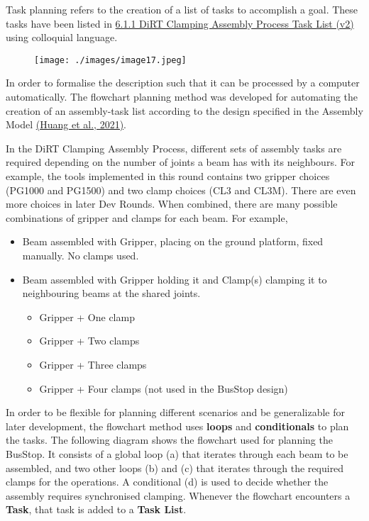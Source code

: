 Task planning refers to the creation of a list of tasks to accomplish a goal. These tasks have been listed in \uline{6.1.1 DiRT Clamping Assembly Process Task List (v2)} using colloquial language.

\begin{figure}[H]
\texttt{[image: ./images/image17.jpeg]}
\end{figure}


In order to formalise the description such that it can be processed by a computer automatically. The flowchart planning method was developed for automating the creation of an assembly-task list according to the design specified in the Assembly Model \href{https://www.zotero.org/google-docs/?cKlfeU}{(Huang et al., 2021)}.

In the DiRT Clamping Assembly Process, different sets of assembly tasks are required depending on the number of joints a beam has with its neighbours. For example, the tools implemented in this round contains two gripper choices (PG1000 and PG1500) and two clamp choices (CL3 and CL3M). There are even more choices in later Dev Rounds. When combined, there are many possible combinations of gripper and clamps for each beam. For example,

\begin{itemize}
	\item Beam assembled with Gripper, placing on the ground platform, fixed manually. No clamps used.

	\item Beam assembled with Gripper holding it and Clamp(s) clamping it to neighbouring beams at the shared joints.

\begin{itemize}
	\item Gripper + One clamp

	\item Gripper + Two clamps

	\item Gripper + Three clamps

	\item Gripper + Four clamps (not used in the BusStop design)

\end{itemize}
\end{itemize}
In order to be flexible for planning different scenarios and be generalizable for later development, the flowchart method uses \textbf{loops }and \textbf{conditionals }to plan the tasks. The following diagram shows the flowchart used for planning the BusStop. It consists of a global loop (a) that iterates through each beam to be assembled, and two other loops (b) and (c) that iterates through the required clamps for the operations. A conditional (d) is used to decide whether the assembly requires synchronised clamping. Whenever the flowchart encounters a \textbf{Task}, that task is added to a \textbf{Task List}. 

